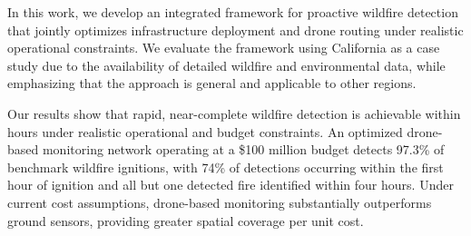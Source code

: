 \documentclass[pdflatex,sn-mathphys-num]{sn-jnl}%
\theoremstyle{thmstyleone}%
\theoremstyle{thmstyletwo}%
\theoremstyle{thmstylethree}%
\newcommand{\danique}[1]{\textcolor{magenta}{#1}}
\begin{document}

In this work, we develop an integrated framework for proactive wildfire detection that jointly optimizes infrastructure deployment and drone routing under realistic operational constraints. We evaluate the framework using California as a case study due to the availability of detailed wildfire and environmental data, while emphasizing that the approach is general and applicable to other regions.


Our results show that rapid, near-complete wildfire detection is achievable within hours under realistic operational and budget constraints. An optimized drone-based monitoring network operating at a \$100 million budget detects 97.3\% of benchmark wildfire ignitions, with 74\% of detections occurring within the first hour of ignition and all but one detected fire identified within four hours.
Under current cost assumptions, drone-based monitoring substantially outperforms ground sensors, providing greater spatial coverage per unit cost.
\end{document}
